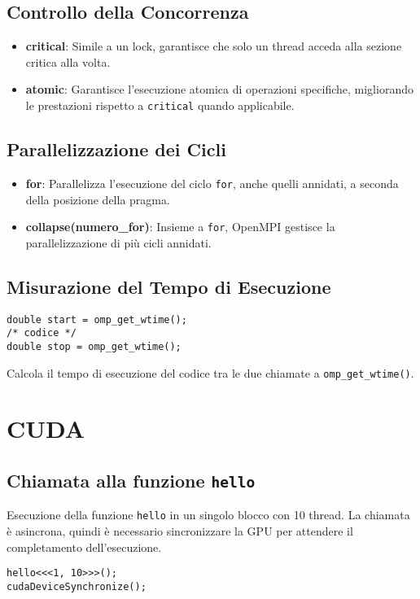 \documentclass[a4paper,12pt]{article}
\begin{document}
\subsection{Controllo della Concorrenza}
\begin{itemize}
    \item \textbf{critical}: Simile a un lock, garantisce che solo un thread acceda alla sezione critica alla volta.
    \item \textbf{atomic}: Garantisce l'esecuzione atomica di operazioni specifiche, migliorando le prestazioni rispetto a \texttt{critical} quando applicabile.
\end{itemize}

\subsection{Parallelizzazione dei Cicli}
\begin{itemize}
    \item \textbf{for}: Parallelizza l'esecuzione del ciclo \texttt{for}, anche quelli annidati, a seconda della posizione della pragma.
    \item \textbf{collapse(numero\_for)}: Insieme a \texttt{for}, OpenMPI gestisce la parallelizzazione di più cicli annidati.
\end{itemize}

\subsection{Misurazione del Tempo di Esecuzione}
\begin{verbatim}
double start = omp_get_wtime();
/* codice */
double stop = omp_get_wtime();
\end{verbatim}

Calcola il tempo di esecuzione del codice tra le due chiamate a \texttt{omp\_get\_wtime()}.

\section{CUDA}

\subsection{Chiamata alla funzione \texttt{hello}}
Esecuzione della funzione \texttt{hello} in un singolo blocco con 10 thread. La chiamata è asincrona, quindi è necessario sincronizzare la GPU per attendere il completamento dell'esecuzione.
\begin{verbatim}
hello<<<1, 10>>>();
cudaDeviceSynchronize();
\end{verbatim}
\end{document}
